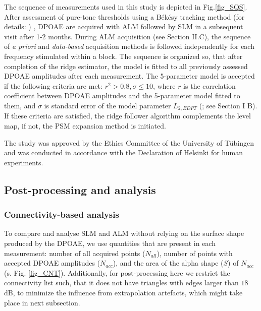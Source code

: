 \documentclass[journal,twoside,web]{ieeecolor2}
\begin{document}
The sequence of measurements used in this study is depicted in Fig.\ref{fig_SQS}.
After assessment of pure-tone thresholds using a Békésy tracking method (for details: \cite{Br2021}) , DPOAE are acquired with ALM followed by SLM in a subsequent visit after 1-2 months.
During ALM acquisition (see Section II.C), the sequence of \textit{a priori} and \textit{data-based} acquisition methods is followed independently for each frequency stimulated within a block.
The sequence is organized so, that after completion of the ridge estimator, the model is fitted to all previously assessed DPOAE amplitudes after each measurement.
The 5-parameter model is accepted if the following criteria are met: $r^2 > 0.8, \sigma \le 10$, where $r$ is the correlation coefficient between DPOAE amplitudes and the 5-parameter model fitted to them, and $\sigma $ is standard error of the model parameter $L_{2, EDPT}$ (\cite{ZD2020}; see Section I B).
If these criteria are satisfied, the ridge follower algorithm complements the level map, if not, the PSM expansion method is initiated.


The study was approved by the Ethics Committee of the University of Tübingen and   was conducted in accordance with the Declaration of Helsinki for human experiments.

\subsection{Post-processing and analysis}

\subsubsection{Connectivity-based analysis}
To compare and analyse SLM and ALM without relying on the surface shape produced by the DPOAE, we use quantities that are present in each measurement: number of all acquired points ($N_{all}$), number of points with accepted DPOAE amplitudes ($N_{acc}$), and the area of the alpha shape ($S$) of $N_{acc}$ (s. Fig. \ref{fig_CNT}).
Additionally, for post-processing here we restrict the connectivity list such, that it does not have triangles with edges larger than $18$ dB, to minimize the influence from extrapolation artefacts, which might take place in next subsection.
\end{document}
